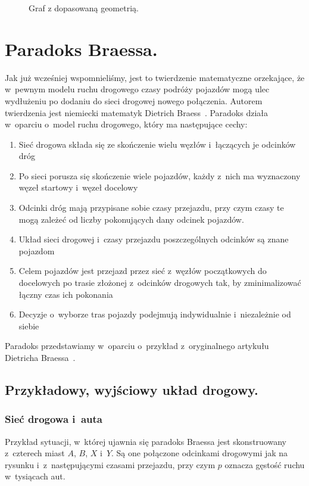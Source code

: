 \documentclass[twoside,12pt]{report}
\begin{document}
\begin{figure}[ht]
\begin{flushright}
\begin{minipage}[]{.45\textwidth}
	\caption{Graf z dopasowaną geometrią.}
	\end{minipage}
\end{flushright}
\end{figure}

\section{Paradoks Braessa.}

Jak już wcześniej wspomnieliśmy, jest to twierdzenie matematyczne orzekające, że w~pewnym modelu ruchu drogowego czasy podróży pojazdów mogą ulec wydłużeniu po dodaniu do sieci drogowej nowego połączenia. Autorem twierdzenia jest niemiecki matematyk Dietrich Braess~\cite{braess}. Paradoks działa w~oparciu o~model ruchu drogowego, który ma następujące cechy:

\begin{enumerate}
\item Sieć drogowa składa się ze skończenie wielu węzłów i~łączących je odcinków dróg
\item Po sieci porusza się skończenie wiele pojazdów, każdy z~nich ma wyznaczony węzeł startowy i~węzeł docelowy
\item Odcinki dróg mają przypisane sobie czasy przejazdu, przy czym czasy te mogą zależeć od liczby pokonujących dany odcinek pojazdów.
\item Układ sieci drogowej i~czasy przejazdu poszczególnych odcinków są znane pojazdom
\item Celem pojazdów jest przejazd przez sieć z~węzłów początkowych do docelowych po trasie złożonej z~odcinków drogowych tak, by zminimalizować łączny czas ich pokonania
\item Decyzje o~wyborze tras pojazdy podejmują indywidualnie i~niezależnie od siebie
\end{enumerate}
Paradoks przedstawiamy w~oparciu o~przykład z~oryginalnego artykułu Dietricha Braessa~\cite{paradox}.

\subsection{Przykładowy, wyjściowy układ drogowy.}
\subsubsection{Sieć drogowa i~auta}

Przykład sytuacji, w~której ujawnia się paradoks Braessa jest skonstruowany z~czterech miast $A$, $B$, $X$ i~$Y$. Są one połączone odcinkami drogowymi jak na rysunku i~z~następującymi czasami przejazdu, przy czym $p$ oznacza gęstość ruchu w~tysiącach aut.
\end{document}

